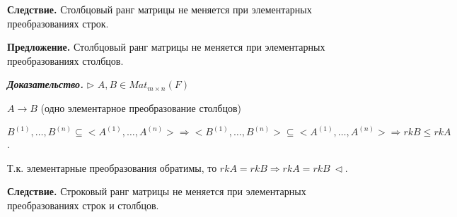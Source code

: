 \bigskip
\textbf{Следствие.} Столбцовый ранг матрицы не меняется при элементарных преобразованиях строк.

\bigskip
\textbf{Предложение.} Столбцовый ранг матрицы не меняется при элементарных преобразованиях столбцов.

\bigskip
\textbf{\textit{Доказательство.}} $\rhd$ $A, B \in Mat_{m \times n} (F)$

$A \rightarrow B$ (одно элементарное преобразование столбцов)

$B^{(1)}, \dots, B^{(n)} \subseteq <A^{(1)}, \dots, A^{(n)}> \Rightarrow <B^{(1)}, \dots, B^{(n)}> \subseteq <A^{(1)}, \dots, A^{(n)}> \Rightarrow rkB \leq rkA$.

Т.к. элементарные преобразования обратимы, то $rkA = rkB \Rightarrow rkA = rkB \ \lhd$.

\bigskip
\textbf{Следствие.} Строковый ранг матрицы не меняется при элементарных преобразованиях строк и столбцов.


